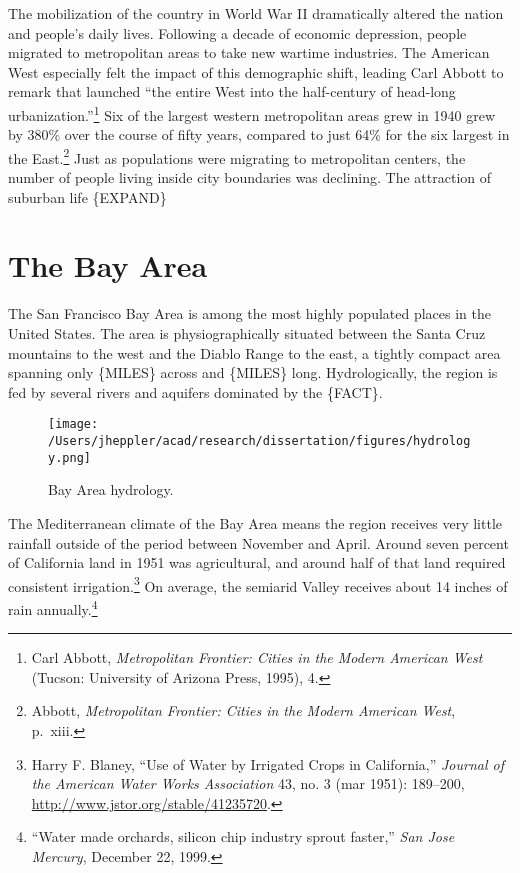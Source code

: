 \documentclass[11pt,article,oneside]{memoir}
\makeatletter
\def\maxwidth{\ifdim\Gin@nat@width>\linewidth\linewidth
\else\Gin@nat@width\fi}
\let\Oldincludegraphics\includegraphics
\renewcommand{\includegraphics}[1]{\Oldincludegraphics[width=\maxwidth]{#1}}
\makeatother
\begin{document}
The mobilization of the country in World War II dramatically altered the
nation and people's daily lives. Following a decade of economic
depression, people migrated to metropolitan areas to take new wartime
industries. The American West especially felt the impact of this
demographic shift, leading Carl Abbott to remark that launched ``the
entire West into the half-century of head-long urbanization.''\footnote{Carl
  Abbott, \emph{Metropolitan Frontier: Cities in the Modern American
  West} (Tucson: University of Arizona Press, 1995), 4.} Six of the
largest western metropolitan areas grew in 1940 grew by 380\% over the
course of fifty years, compared to just 64\% for the six largest in the
East.\footnote{Abbott, \emph{Metropolitan Frontier: Cities in the Modern
  American West}, p.~xiii.} Just as populations were migrating to
metropolitan centers, the number of people living inside city boundaries
was declining. The attraction of suburban life \{EXPAND\}

\section{The Bay Area}

The San Francisco Bay Area is among the most highly populated places in
the United States. The area is physiographically situated between the
Santa Cruz mountains to the west and the Diablo Range to the east, a
tightly compact area spanning only \{MILES\} across and \{MILES\} long.
Hydrologically, the region is fed by several rivers and aquifers
dominated by the \{FACT\}.

\begin{figure}[htbp]
\centering
\texttt{[image: /Users/jheppler/acad/research/dissertation/figures/hydrology.png]}
\caption{Bay Area hydrology.}
\end{figure}

The Mediterranean climate of the Bay Area means the region receives very
little rainfall outside of the period between November and April. Around
seven percent of California land in 1951 was agricultural, and around
half of that land required consistent irrigation.\footnote{Harry F.
  Blaney, ``Use of Water by Irrigated Crops in California,''
  \emph{Journal of the American Water Works Association} 43, no. 3 (mar
  1951): 189--200,
  \href{http://www.jstor.org/stable/41235720}{http://www.jstor.org/stable/41235720}.}
On average, the semiarid Valley receives about 14 inches of rain
annually.\footnote{``Water made orchards, silicon chip industry sprout
  faster,'' \emph{San Jose Mercury}, December 22, 1999.}
\end{document}

